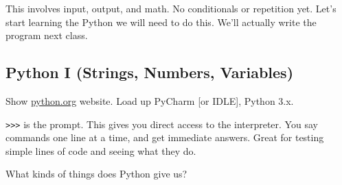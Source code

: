 \documentclass{article}
\begin{document}
This involves input, output, and math.  No conditionals or repetition
yet.  Let's start learning the Python we will need to do this.  We'll
actually write the program next class.

\subsection*{Python I (Strings, Numbers, Variables)}

Show \url{python.org} website.  Load up PyCharm [or IDLE], Python 3.x.

\texttt{>>>} is the prompt.  This gives you direct access to the
interpreter.  You say commands one line at a time, and get immediate
answers.  Great for testing simple lines of code and seeing what they
do.

What kinds of things does Python give us?
\end{document}
